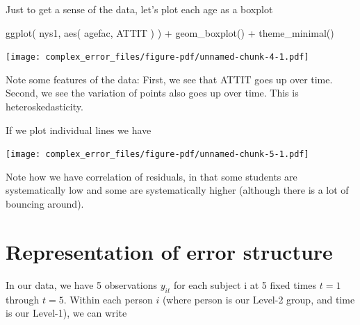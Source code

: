 \documentclass[
  letterpaper,
  DIV=11,
  numbers=noendperiod]{scrreprt}
\newenvironment{Shaded}{}{}
\newcommand{\AttributeTok}[1]{\textcolor[rgb]{0.49,0.56,0.16}{#1}}
\newcommand{\FloatTok}[1]{\textcolor[rgb]{0.25,0.63,0.44}{#1}}
\newcommand{\FunctionTok}[1]{\textcolor[rgb]{0.02,0.16,0.49}{#1}}
\newcommand{\NormalTok}[1]{#1}
\newcommand{\OtherTok}[1]{\textcolor[rgb]{0.00,0.44,0.13}{#1}}
\newcommand{\SpecialCharTok}[1]{\textcolor[rgb]{0.25,0.44,0.63}{#1}}
\begin{document}
Just to get a sense of the data, let's plot each age as a boxplot

\begin{Shaded}
\begin{Highlighting}[]
\FunctionTok{ggplot}\NormalTok{( nys1, }\FunctionTok{aes}\NormalTok{( agefac, ATTIT ) ) }\SpecialCharTok{+}
  \FunctionTok{geom\_boxplot}\NormalTok{() }\SpecialCharTok{+}
  \FunctionTok{theme\_minimal}\NormalTok{()}
\end{Highlighting}
\end{Shaded}

\texttt{[image: complex\_error\_files/figure-pdf/unnamed-chunk-4-1.pdf]}

Note some features of the data: First, we see that ATTIT goes up over
time. Second, we see the variation of points also goes up over time.
This is heteroskedasticity.

If we plot individual lines we have

\begin{Shaded}
\end{Shaded}

\texttt{[image: complex\_error\_files/figure-pdf/unnamed-chunk-5-1.pdf]}

Note how we have correlation of residuals, in that some students are
systematically low and some are systematically higher (although there is
a lot of bouncing around).

\section{Representation of error
structure}\label{representation-of-error-structure}

In our data, we have 5 observations \(y_{it}\) for each subject i at 5
fixed times \(t=1\) through \(t=5\). Within each person \(i\) (where
person is our Level-2 group, and time is our Level-1), we can write
\end{document}
